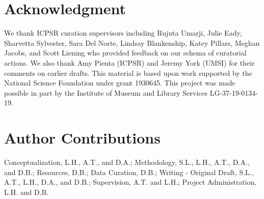 \documentclass[conference]{IEEEtran}
\begin{document}
\section{Acknowledgment}
\label{acknowledgement}
We thank ICPSR curation supervisors including Rujuta Umarji, Julie Eady, Sharvetta Sylvester, Sara Del Norte, Lindsay Blankenship, Katey Pillars, Meghan Jacobs, and Scott Liening who provided feedback on our schema of curatorial actions. We also thank Amy Pienta (ICPSR) and Jeremy York (UMSI) for their comments on earlier drafts. This material is based upon work supported by the National Science Foundation under grant 1930645. This project was made possible in part by the Institute of Museum and Library Services LG-37-19-0134-19.

\section{Author Contributions}
\label{author-contributions}
Conceptualization, L.H., A.T., and D.A.; Methodology, S.L., L.H., A.T., D.A., and D.B.; Resources, D.B.; Data Curation, D.B.; Writing - Original Draft, S.L., A.T., L.H., D.A., and D.B.; Supervision, A.T. and L.H.; Project Administration, L.H. and D.B.

% 
% 
\end{document}
